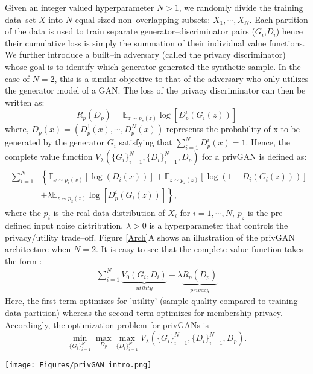 \documentclass{article}
\begin{document}
Given an integer valued hyperparameter $N>1$, we randomly divide the training data--set $X$ into $N$ equal sized non--overlapping subsets: $X_1, \cdots, X_N$. Each partition of the data is used to train separate generator--discriminator pairs ($G_i$,$D_i$) hence their cumulative loss is simply the summation of their individual value functions. We further introduce a built--in adversary (called the privacy discriminator) whose goal is to identify which generator generated the synthetic sample. In the case of $N=2$, this is a similar objective to that of the adversary who only utilizes the generator model of a GAN. The loss of the privacy discriminator can then be written as: \begin{equation*}
    R_p(D_p) = \mathbb{E}_{z\sim p_{z}(z)}\log[D_p^i(G_i(z))]
\end{equation*}
where, $D_p(x)=(D_p^1(x),\cdots,D_p^N(x))$ represents the probability of x to be generated by the generator $G_i$ satisfying that  $\sum\limits_{i=1}^N D_p^i(x)=1$. Hence, the complete value function $V_\lambda(\{G_i\}_{i=1}^N,\{D_i\}_{i=1}^N, D_p)$  for a privGAN is defined as: 
\begin{align*}
\begin{split}
        \sum_{i=1}^N &\left\{ \mathbb{E}_{x\sim p_{i}(x)}[\log(D_i(x))] + 
     \mathbb{E}_{z\sim p_{z}(z)}[\log(1-D_i(G_i(z)))]\right.\\
      &\left.+ \lambda \mathbb{E}_{z\sim p_{z}(z)}\log[D_p^i(G_i(z))]\right\},
\end{split}
\end{align*}
where the $p_i$ is the real data distribution of $X_i$ for $i=1,\cdots,N$, $p_z$ is the pre-defined input noise distribution, $\lambda>0$ is a hyperparameter that controls the privacy/utility trade--off. Figure \ref{Arch}A shows an illustration of the privGAN architecture when $N=2$. It is easy to see that the complete value function takes the form :
\begin{align*}
    \sum_{i=1}^N \underbrace{V_0 (G_i,D_i)}_{utility} + \lambda \underbrace{ R_p(D_p)}_{privacy}
\end{align*}
Here, the first term optimizes for 'utility' (sample quality compared to training data partition) whereas the second term optimizes for membership privacy. Accordingly, the optimization problem for privGANs is 
\begin{equation}\label{eqn:optimization}
\min_{\{G_i\}_{i=1}^N} \max_{D_p}\max_{\{D_i\}_{i=1}^N} V_\lambda(\{G_i\}_{i=1}^N,\{D_i\}_{i=1}^N, D_p). 
\end{equation}
\begin{figure*}[h!]
    \centering
    \texttt{[image: Figures/privGAN\_intro.png]}
    \caption{A) The privGAN architecture with 2 generator-discriminator pairs. B) Illustration of how privGAN provides protection against membership inference attacks by preventing memorization of the training set. }
    \label{Arch}
\end{figure*}
\end{document}
